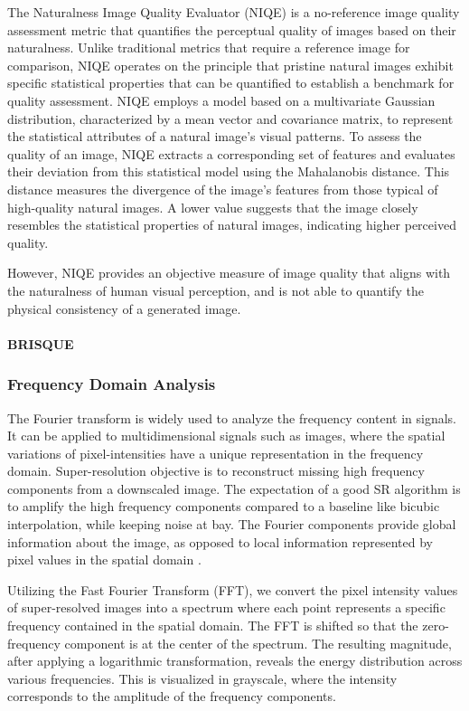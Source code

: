         
            The Naturalness Image Quality Evaluator (NIQE) \cite{niqe} is a no-reference image quality assessment metric that quantifies the perceptual quality of images based on their naturalness. Unlike traditional metrics that require a reference image for comparison, NIQE operates on the principle that pristine natural images exhibit specific statistical properties that can be quantified to establish a benchmark for quality assessment. NIQE employs a model based on a multivariate Gaussian distribution, characterized by a mean vector and covariance matrix, to represent the statistical attributes of a natural image's visual patterns. To assess the quality of an image, NIQE extracts a corresponding set of features and evaluates their deviation from this statistical model using the Mahalanobis distance. This distance measures the divergence of the image's features from those typical of high-quality natural images. A lower value suggests that the image closely resembles the statistical properties of natural images, indicating higher perceived quality.
            
            However, NIQE provides an objective measure of image quality that aligns with the naturalness of human visual perception, and is not able to quantify the physical consistency of a generated image.
        \paragraph{BRISQUE}

        \subsubsection{Frequency Domain Analysis}
        
        The Fourier transform is widely used to analyze the frequency content in signals.  It can be applied to multidimensional signals such as images, where the spatial variations of pixel-intensities have a unique representation in the frequency domain. Super-resolution objective is to reconstruct missing high frequency components from a downscaled image. The expectation of a good SR algorithm is to amplify the high frequency components compared to a baseline like bicubic interpolation, while keeping noise at bay. The Fourier components provide global information about the image, as opposed to local information represented by pixel values in the spatial domain \cite{fuoli2021fourier}. 

        
        Utilizing the Fast Fourier Transform (FFT), we convert the pixel intensity values of super-resolved images into a spectrum where each point represents a specific frequency contained in the spatial domain. The FFT is shifted so that the zero-frequency component is at the center of the spectrum. The resulting magnitude, after applying a logarithmic transformation, reveals the energy distribution across various frequencies. This is visualized in grayscale, where the intensity corresponds to the amplitude of the frequency components.
        
